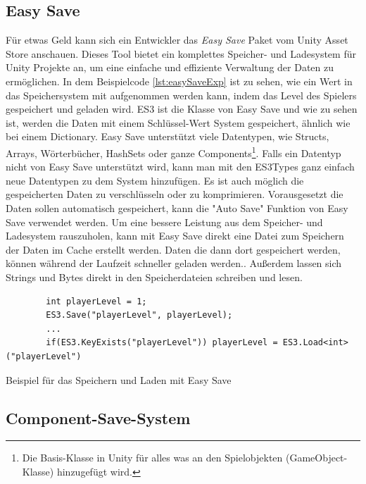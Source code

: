 \subsection{Easy Save}
Für etwas Geld kann sich ein Entwickler das \textit{Easy Save} Paket vom Unity Asset Store anschauen. Dieses Tool bietet ein komplettes Speicher- und Ladesystem für Unity Projekte an, um eine einfache und effiziente Verwaltung der Daten zu ermöglichen.\cite{unityEasySave} In dem Beispielcode \ref{lst:easySaveExp} ist zu sehen, wie ein Wert in das Speichersystem mit aufgenommen werden kann, indem das Level des Spielers gespeichert und geladen wird. ES3 ist die Klasse von Easy Save und wie zu sehen ist, werden die Daten mit einem Schlüssel-Wert System gespeichert, ähnlich wie bei einem Dictionary.\cite{moodkieGettingStarted} Easy Save unterstützt viele Datentypen, wie Structs, Arrays, Wörterbücher, HashSets oder ganze Components\footnote{Die Basis-Klasse in Unity für alles was an den Spielobjekten (GameObject-Klasse) hinzugefügt wird.\cite{unityComponent}}.\cite{moodkieSupportedTypes} Falls ein Datentyp nicht von Easy Save unterstützt wird, kann man mit den ES3Types ganz einfach neue Datentypen zu dem System hinzufügen.\cite{moodkieChoosingWhat} Es ist auch möglich die gespeicherten Daten zu verschlüsseln oder zu komprimieren.\cite{moodkieGettingStarted} Vorausgesetzt die Daten sollen automatisch gespeichert, kann die "Auto Save" Funktion von Easy Save verwendet werden.\cite{moodkieAutoSave} Um eine bessere Leistung aus dem Speicher- und Ladesystem rauszuholen, kann mit Easy Save direkt eine Datei zum Speichern der Daten im Cache erstellt werden. Daten die dann dort gespeichert werden, können während der Laufzeit schneller geladen werden.\cite{moodkieImprovingPerformance}. Außerdem lassen sich Strings und Bytes direkt in den Speicherdateien schreiben und lesen.\cite{moodkieSavingLoading} 

\begin{listing}[htp]
    \begin{verbatim} 
        int playerLevel = 1;
        ES3.Save("playerLevel", playerLevel);
        ... 
        if(ES3.KeyExists("playerLevel")) playerLevel = ES3.Load<int>("playerLevel")
    \end{verbatim}
    \caption{Beispiel für das Speichern und Laden mit Easy Save}
    \label{lst:easySaveExp}
\end{listing}

\subsection{Component-Save-System}

